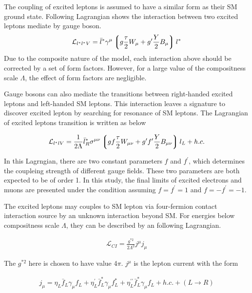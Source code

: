 The coupling of excited leptons is assumed to have a similar form as their SM ground state. Following Lagrangian shows the interaction between two excited leptons mediate by gauge boson.
\begin{align}
 \mathcal{L}_{l^{*}l^{*}V} = \bar{l}^{*}\gamma^{\mu}\left\lgroup  g\frac{\tau}{2}W_{\mu} + g^{\prime}\frac{Y}{2}B_{\mu} \right\rgroup l^{*}
\end{align}
\noindent Due to the composite nature of the model, each interaction above should be corrected by a set of form factors. However, for a large value of the compositness scale $\Lambda$, the effect of form factors are negligible.

Gauge bosons can also mediate the transitions between right-handed excited leptons and left-handed SM leptons. This interaction leaves a signature to discover excited lepton by searching for resonance of SM leptons. The Lagrangian of excited leptons transition is written as below

\begin{align}
\mathcal{L}_{l^{*}lV} = \frac{1}{2\Lambda}\bar{l}_{R}^{*}\sigma^{\mu\nu} \left\lgroup gf\frac{\tau}{2}W_{\mu\nu} + g^{\prime}f^{\prime}\frac{Y}{2}B_{\mu\nu} \right\rgroup l_{L} + h.c.
\end{align}  

\noindent In this Lagrngian, there are two constant parameters $f$ and $f^{\prime}$, which determines the coupleing strength of different gauge fields. These two parameters are both expected to be of order 1. In this study, the final limits of excited electrons and muons are presented under the condition assuming $f = f^{\prime} = 1$ and $f = -f^{\prime} = -1$. 
 
The excited leptons may couples to SM lepton via four-fermion contact interaction source by an unknown interaction beyond SM. For energies below compositness scale $\Lambda$, they can be described by an following Lagrangian.

\begin{align}
\mathcal{L}_{CI} = \frac{g^{*2}}{2\Lambda^{2}}j^{\mu}j_{\mu}
\end{align}

\noindent The $g^{*2}$ here is chosen to have value 4$\pi$. $j^{\mu}$ is the lepton current with the form

\begin{align}
j_{\mu} = \eta_{L}\bar{f}_{L}\gamma_{\mu}f_{L} + \eta_{L}^{\prime}\bar{f}_{L}^{*}\gamma_{\mu}f_{L}^{*} + \eta_{L}^{\prime\prime}\bar{f}_{L}^{*}\gamma_{\mu}f_{L} + h.c. + (L \rightarrow R)
\end{align}

